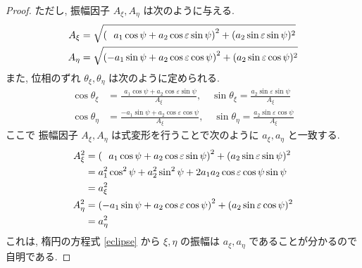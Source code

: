 \documentclass[a4paper,dvipdfmx]{jsarticle}
\theoremstyle{definition}
\begin{document}
\begin{proof}
  ただし, 振幅因子 $A_\xi, A_\eta$ は次のように与える.
  \begin{align}
    A_\xi  & = \sqrt{\qty(\ \ a_1\cos\psi + a_2\cos\varepsilon\sin\psi)^2 + (a_2\sin\varepsilon\sin\psi)^2} \\
    A_\eta & = \sqrt{\qty(-a_1\sin\psi + a_2\cos\varepsilon\cos\psi)^2 + (a_2\sin\varepsilon\cos\psi)^2}
  \end{align}
  また, 位相のずれ $\theta_\xi, \theta_\eta$ は次のように定められる.
  \begin{align}
    \cos\theta_\xi  & = \frac{\ \ a_1\cos\psi + a_2\cos\varepsilon\sin\psi}{A_\xi}, \quad \sin\theta_\xi = \frac{a_2\sin\varepsilon\sin\psi}{A_\xi}  \\
    \cos\theta_\eta & = \frac{-a_1\sin\psi + a_2\cos\varepsilon\cos\psi}{A_\xi},    \quad \sin\theta_\eta = \frac{a_2\sin\varepsilon\cos\psi}{A_\xi}
  \end{align}
  ここで 振幅因子 $A_\xi, A_\eta$ は式変形を行うことで次のように $a_\xi, a_\eta$ と一致する.
  \begin{align}
    A_\xi^2  & = \qty(\ \ a_1\cos\psi + a_2\cos\varepsilon\sin\psi)^2 + (a_2\sin\varepsilon\sin\psi)^2 \\
             & = a_1^2\cos^2\psi + a_2^2\sin^2\psi + 2a_1a_2\cos\varepsilon\cos\psi\sin\psi            \\
             & = a_\xi^2                                                                               \\
    A_\eta^2 & = \qty(-a_1\sin\psi + a_2\cos\varepsilon\cos\psi)^2 + (a_2\sin\varepsilon\cos\psi)^2    \\
             & = a_\eta^2
  \end{align}
  これは, 楕円の方程式 \eqref{eclipse} から $\xi, \eta$ の振幅は $a_\xi, a_\eta$ であることが分かるので自明である.


\end{proof}
\end{document}
